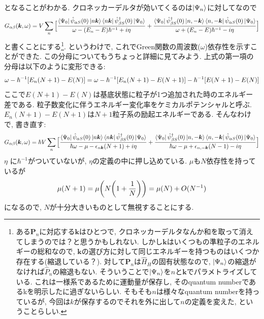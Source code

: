 \documentclass[10.5pt,a4paper]{jreport}
\newcommand{\bk}{\bm{k}}
\begin{document}
となることがわかる. クロネッカーデルタが効いてくるのは$\ket{\Psi_n}$に対してなので
\begin{eqnarray}
  G_{\alpha\beta}(\bk, \omega) = V\sum_n\Big[\frac{\bra{\Psi_0}\hat{\psi}_{\alpha S}(0)\ket{n\bk}\bra{n\bk}\hat{\psi}^\dagger_{\beta S}(0)\ket{\Psi_0}}{\omega - \qty(E_n - E)\hbar^{-1} + i\eta}+ \frac{\bra{\Psi_0}\hat{\psi}^\dagger_{\beta S}(0)\ket{n, -\bk}\bra{n, -\bk}\hat{\psi}_{\alpha S}(0)\ket{\Psi_0}}{\omega + \qty(E_n - E)\hbar^{-1} - i\eta}\Big]
\end{eqnarray}
と書くことにする\footnote{ある$\bm{P}_n$に対応する$\bk$はひとつで, クロネッカーデルタなんか和を取って消えてしまうのでは？と思うかもしれない. しかし$\bk$はいくつもの準粒子のエネルギーの総和なので, $\bk$の選び方に対して同じエネルギーを持つものはいくつか存在する(縮退している？). 対して$\bm{P}_n$は$\hat{H}_H$の固有状態なので, $\ket{\Psi_n}$の縮退がなければ$\hat{P}_n$の縮退もない. そういうことで$\ket{\Psi_n}$を$n$と$\bk$でパラメトライズしている. これは一様系であるために運動量が保存し, そのquantum numberであるkを明示したに過ぎないらしい. そもそも$n$は様々なquantum numberを持っているが, 今回は$k$が保存するのでそれを外に出して$n$の定義を変えた, ということらしい. }. というわけで, これでGreen関数の周波数($\omega$)依存性を示すことができた. この分母についてもうちょっと詳細に見てみよう. 上式の第一項の分母は以下のように変形できる:
\begin{eqnarray}
  \omega - \hbar^{-1}\qty[E_n(N+1) - E(N)] = \omega - \hbar^{-1}\qty[E_n(N+1) - E(N+1)] -\hbar^{-1}\qty[E(N+1) - E(N)]
\end{eqnarray}
ここで$E(N+1) - E(N)$は基底状態に粒子が1つ追加された時のエネルギー差である. 粒子数変化に伴うエネルギー変化率をケミカルポテンシャルと呼ぶ. $E_n(N+1) - E(N+1)$は$N+1$粒子系の励起エネルギーである. そんなわけで, 書き直す:
\begin{eqnarray}
  G_{\alpha\beta}(\bk, \omega) = \hbar V\sum_n\Big[\frac{\bra{\Psi_0}\hat{\psi}_{\alpha S}(0)\ket{n\bk}\bra{n\bk}\hat{\psi}^\dagger_{\beta S}(0)\ket{\Psi_0}}{\hbar\omega -\mu - \epsilon_{n\bk}\qty(N+1) + i\eta}+ \frac{\bra{\Psi_0}\hat{\psi}^\dagger_{\beta S}(0)\ket{n, -\bk}\bra{n, -\bk}\hat{\psi}_{\alpha S}(0)\ket{\Psi_0}}{\hbar\omega -\mu + \epsilon_{n,-\bk}\qty(N-1) - i\eta}\Big]\label{green-rehmann}
\end{eqnarray}
$\eta$ に$\hbar^{-1}$がついていないが, $\eta$の定義の中に押し込めている. $\mu$も$N$依存性を持っているが
\begin{eqnarray}
  \mu(N+1) = \mu\qty(N\qty(1+\frac{1}{N})) = \mu(N) + O(N^{-1})
\end{eqnarray}
になるので, $N$が十分大きいものとして無視することにする.
\end{document}
